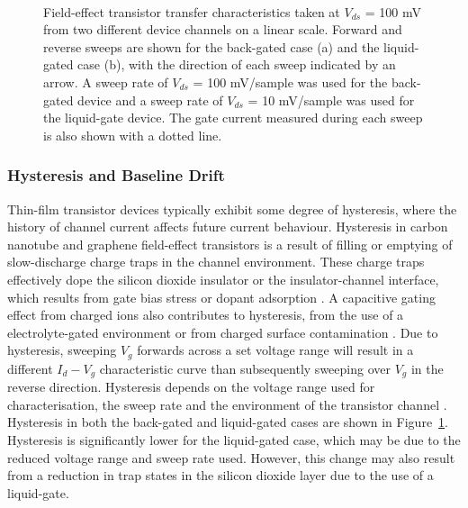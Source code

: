 \documentclass[
  a4paper,
]{scrbook}
\begin{document}
\begin{figure}
\begin{minipage}[t]{0.45\linewidth}
\end{minipage}%
%
\begin{minipage}[t]{0.01\linewidth}

{\centering 

~

}

\end{minipage}%

\caption{\label{fig-gating-hysteresis}Field-effect transistor transfer
characteristics taken at \(V_{ds}\) = 100 mV from two different device
channels on a linear scale. Forward and reverse sweeps are shown for the
back-gated case (a) and the liquid-gated case (b), with the direction of
each sweep indicated by an arrow. A sweep rate of \(V_{ds}\) = 100
mV/sample was used for the back-gated device and a sweep rate of
\(V_{ds}\) = 10 mV/sample was used for the liquid-gate device. The gate
current measured during each sweep is also shown with a dotted line.}

\end{figure}

\hypertarget{hysteresis-and-baseline-drift}{%
\subsubsection*{Hysteresis and Baseline
Drift}\label{hysteresis-and-baseline-drift}}

Thin-film transistor devices typically exhibit some degree of
hysteresis, where the history of channel current affects future current
behaviour. Hysteresis in carbon nanotube and graphene field-effect
transistors is a result of filling or emptying of slow-discharge charge
traps in the channel environment. These charge traps effectively dope
the silicon dioxide insulator or the insulator-channel interface, which
results from gate bias stress or dopant adsorption
\autocite{McEuen2002,Kim2003,Wang2010,Bargaoui2018}. A capacitive gating
effect from charged ions also contributes to hysteresis, from the use of
a electrolyte-gated environment or from charged surface contamination
\autocite{Wang2010,Yao2021}. Due to hysteresis, sweeping \(V_g\)
forwards across a set voltage range will result in a different
\(I_d - V_g\) characteristic curve than subsequently sweeping over
\(V_g\) in the reverse direction. Hysteresis depends on the voltage
range used for characterisation, the sweep rate and the environment of
the transistor channel \autocite{Kim2003,Wang2010}. Hysteresis in both
the back-gated and liquid-gated cases are shown in
Figure~\ref{fig-gating-hysteresis}. Hysteresis is significantly lower
for the liquid-gated case, which may be due to the reduced voltage range
and sweep rate used. However, this change may also result from a
reduction in trap states in the silicon dioxide layer due to the use of
a liquid-gate.
\end{document}
